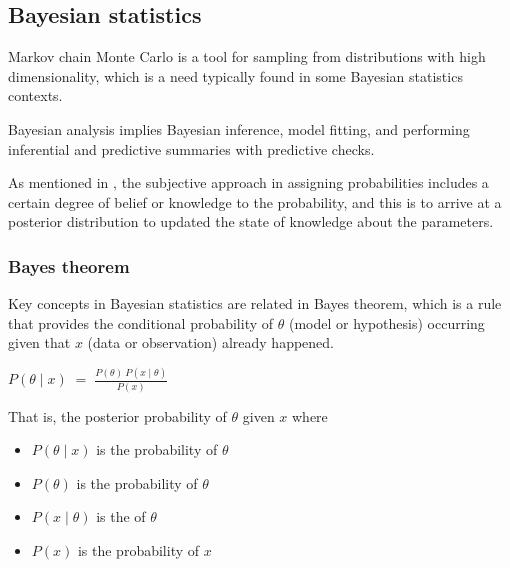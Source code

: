 \documentclass[a4paper,12pt,english]{sphinxhowto}
\begin{document}


\subsection{Bayesian statistics}
\label{\detokenize{MCMC:bayesian-statistics}}\label{\detokenize{MCMC:bayes}}
Markov chain Monte Carlo is a tool for sampling from distributions with high dimensionality,
which is a need typically found in some Bayesian statistics contexts.

Bayesian analysis implies Bayesian inference, model fitting, and performing inferential and
predictive summaries with predictive checks.

As mentioned in {\hyperref[\detokenize{Uncertainty:uncertainty}]{}}, the subjective approach in
assigning probabilities includes a certain degree of belief or knowledge to the probability,
and this is to arrive at a posterior distribution to updated the state of knowledge about the
parameters.



\subsubsection{Bayes theorem}
\label{\detokenize{MCMC:bayes-theorem}}\label{\detokenize{MCMC:bayest}}
Key concepts in Bayesian statistics are related in Bayes theorem, which is a rule
that provides the conditional probability of \(\theta\) (model or hypothesis)
occurring given that \(x\) (data or observation) already happened.

\(P(\theta \mid x) \;=\; \frac{ P(\theta)~P(x \mid \theta)  } { P(x)  }\)

That is, the posterior probability of \(\theta\) given \(x\) where
\begin{itemize}
\item {} 
\(P(\theta \mid x)\) is the  probability of \(\theta\)

\item {} 
\(P(\theta)\) is the  probability of \(\theta\)

\item {} 
\(P(x \mid \theta)\) is the  of \(\theta\)

\item {} 
\(P(x)\) is the  probability of \(x\)

\end{itemize}
\end{document}
